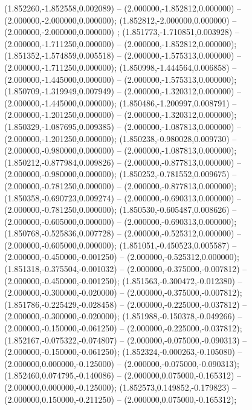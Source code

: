  (1.852260,-1.852558,0.002089) -- (2.000000,-1.852812,0.000000) -- (2.000000,-2.000000,0.000000);
 (1.852812,-2.000000,0.000000) -- (2.000000,-2.000000,0.000000) ;
 (1.851773,-1.710851,0.003928) -- (2.000000,-1.711250,0.000000) -- (2.000000,-1.852812,0.000000);
 (1.851352,-1.574859,0.005518) -- (2.000000,-1.575313,0.000000) -- (2.000000,-1.711250,0.000000);
 (1.850998,-1.444564,0.006858) -- (2.000000,-1.445000,0.000000) -- (2.000000,-1.575313,0.000000);
 (1.850709,-1.319949,0.007949) -- (2.000000,-1.320312,0.000000) -- (2.000000,-1.445000,0.000000);
 (1.850486,-1.200997,0.008791) -- (2.000000,-1.201250,0.000000) -- (2.000000,-1.320312,0.000000);
 (1.850329,-1.087695,0.009385) -- (2.000000,-1.087813,0.000000) -- (2.000000,-1.201250,0.000000);
 (1.850238,-0.980028,0.009730) -- (2.000000,-0.980000,0.000000) -- (2.000000,-1.087813,0.000000);
 (1.850212,-0.877984,0.009826) -- (2.000000,-0.877813,0.000000) -- (2.000000,-0.980000,0.000000);
 (1.850252,-0.781552,0.009675) -- (2.000000,-0.781250,0.000000) -- (2.000000,-0.877813,0.000000);
 (1.850358,-0.690723,0.009274) -- (2.000000,-0.690313,0.000000) -- (2.000000,-0.781250,0.000000);
 (1.850530,-0.605487,0.008626) -- (2.000000,-0.605000,0.000000) -- (2.000000,-0.690313,0.000000);
 (1.850768,-0.525836,0.007728) -- (2.000000,-0.525312,0.000000) -- (2.000000,-0.605000,0.000000);
 (1.851051,-0.450523,0.005587) -- (2.000000,-0.450000,-0.001250) -- (2.000000,-0.525312,0.000000);
 (1.851318,-0.375504,-0.001032) -- (2.000000,-0.375000,-0.007812) -- (2.000000,-0.450000,-0.001250);
 (1.851563,-0.300472,-0.012380) -- (2.000000,-0.300000,-0.020000) -- (2.000000,-0.375000,-0.007812);
 (1.851786,-0.225429,-0.028458) -- (2.000000,-0.225000,-0.037812) -- (2.000000,-0.300000,-0.020000);
 (1.851988,-0.150378,-0.049266) -- (2.000000,-0.150000,-0.061250) -- (2.000000,-0.225000,-0.037812);
 (1.852167,-0.075322,-0.074807) -- (2.000000,-0.075000,-0.090313) -- (2.000000,-0.150000,-0.061250);
 (1.852324,-0.000263,-0.105080) -- (2.000000,0.000000,-0.125000) -- (2.000000,-0.075000,-0.090313);
 (1.852460,0.074795,-0.140086) -- (2.000000,0.075000,-0.165312) -- (2.000000,0.000000,-0.125000);
 (1.852573,0.149852,-0.179823) -- (2.000000,0.150000,-0.211250) -- (2.000000,0.075000,-0.165312);
